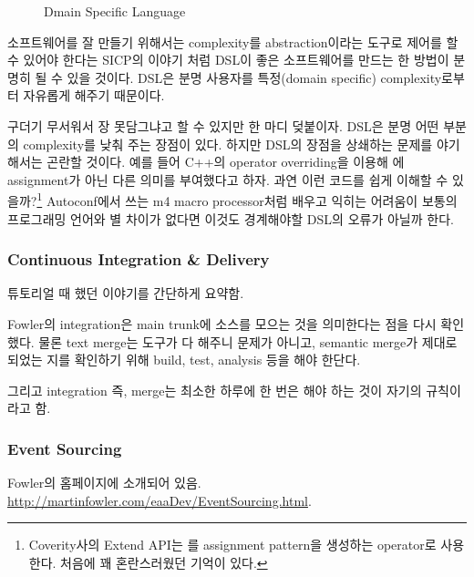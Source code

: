 \documentclass[11pt]{article}
\begin{document}
\begin{figure}[t]
    \begin{Frame}
        \begin{center}
        \end{center}
    \end{Frame}
    \caption{Dmain Specific Language}
    \label{dsl}
\end{figure}
 
소프트웨어를 잘 만들기 위해서는 complexity를 abstraction이라는 도구로
제어를 할 수 있어야 한다는 SICP의 이야기\cite{sicp} 처럼 DSL이 좋은 
소프트웨어를 만드는 한 방법이 분명히 될 수 있을 것이다. DSL은 분명 사용자를
특정(domain specific) complexity로부터 자유롭게 해주기 때문이다.

 
구더기 무서워서 장 못담그냐고 할 수 있지만 한 마디 덪붙이자. DSL은 분명
어떤 부분의 complexity를 낮춰 주는 장점이 있다. 하지만  DSL의 장점을 상쇄하는
문제를 야기해서는 곤란할 것이다. 예를 들어 C++의 operator overriding을 이용해 
\mbtt{=}에 assignment가 아닌 다른 의미를 부여했다고 하자. 과연 이런 코드를 쉽게 
이해할 수 있을까?\footnote{Coverity사의 Extend API는 \mbtt{=}를 assignment
pattern을 생성하는 operator로 사용한다. 처음에 꽤 혼란스러웠던 기억이 있다.}
Autoconf에서 쓰는 m4 macro processor처럼 배우고 익히는 어려움이 보통의 
프로그래밍 언어와 별 차이가 없다면 이것도 경계해야할 DSL의 오류가 아닐까 한다.


\subsubsection{Continuous Integration \& Delivery}
 
튜토리얼 때 했던 이야기를 간단하게 요약함. 
 
Fowler의 integration은 main trunk에 소스를 모으는 것을 의미한다는 점을
다시 확인했다. 물론 text merge는 도구가 다 해주니 문제가 아니고,
semantic merge가 제대로 되었는 지를 확인하기 위해 build, test,
analysis 등을 해야 한단다.
 
그리고 integration 즉, merge는 최소한 하루에 한 번은 해야 하는 것이
자기의 규칙이라고 함.
 
\subsubsection{Event Sourcing}
 
Fowler의 홈페이지에 소개되어 있음.
\url{http://martinfowler.com/eaaDev/EventSourcing.html}.
 
\end{document}
